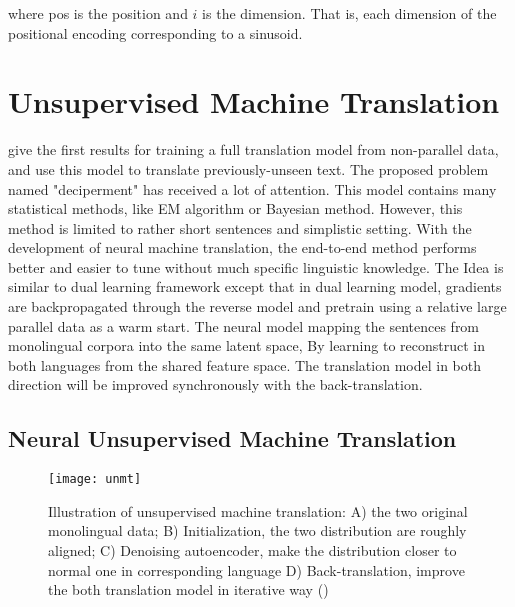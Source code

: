 where pos is the position and $i$ is the dimension. That is, each dimension of the positional encoding corresponding to a sinusoid.

\section{Unsupervised Machine Translation}
give the first results for training a full translation model from non-parallel data, and use this model to translate previously-unseen text. The proposed problem named "deciperment" has received a lot of attention. This model contains many statistical methods, like EM algorithm or Bayesian method. However, this method is limited to rather short sentences and simplistic setting. With the development of neural machine translation, the end-to-end method performs better and easier to tune without much specific linguistic knowledge. The Idea is similar to dual learning framework except that in dual learning model, gradients are backpropagated through the reverse model and pretrain using a relative large parallel data as a warm start. The neural model mapping the sentences from monolingual corpora into the same latent space, By learning to reconstruct in both languages from the shared feature space. The translation model in both direction will be improved synchronously with the back-translation.




\subsection{Neural Unsupervised Machine Translation}

\begin{figure}[h]
	\texttt{[image: unmt]}
	\caption{Illustration of unsupervised machine translation: A) the two original monolingual data; B) Initialization, the two distribution are roughly aligned; C) Denoising autoencoder, make the distribution closer to normal one in corresponding language D) Back-translation, improve the both translation model in iterative way (\cite{lample2018phrase})}

\end{figure}





